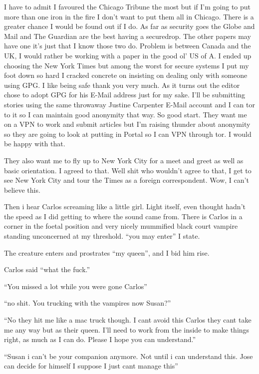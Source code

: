I have to admit I favoured the Chicago Tribune the most but if I'm going to put more than one iron in the fire I don't want to put them all in Chicago. There is a greater chance I would be found out if I do. As far as security goes the Globe and Mail and The Guardian are the best having a securedrop. The other papers may have one it's just that I know those two do. Problem is between Canada and the UK, I would rather be working with a paper in the good ol' US of A. I ended up choosing the New York Times but among the worst for secure systems I put my foot down so hard I cracked concrete on insisting on dealing only with someone using GPG. I like being safe thank you very much. As it turns out the editor chose to adopt GPG for his E-Mail address just for my sake. I'll be submitting stories using the same throwaway Justine Carpenter E-Mail account and I can tor to it so I can maintain good anonymity that way. So good start. They want me on a VPN to work and submit articles but I'm raising thunder about anonymity so they are going to look at putting in Portal so I can VPN through tor. I would be happy with that.

They also want me to fly up to New York City for a meet and greet as well as basic orientation. I agreed to that. Well shit who wouldn't agree to that, I get to see New York City  and tour the Times as a foreign correspondent. Wow, I can't believe this.

Then i hear Carlos screaming like a little girl. Light itself, even thought hadn't the speed as I did getting to where the sound came from. There is Carlos in a corner in the foetal position and very nicely mummified black court vampire standing unconcerned at my threshold. ``you may enter'' I state.

The creature enters and prostrates ``my queen'', and I bid him rise. 

Carlos said ``what the fuck.''

``You missed a lot while you were gone Carlos''

``no shit. You trucking with the vampires now Susan?''

``No they hit me like a mac truck though. I cant avoid this Carlos they cant take me any way but as their queen. I'll need to work from the inside to make things right, as much as I can do. Please I hope you can understand.''

``Susan i can't be your companion anymore. Not until i can understand this. Jose can decide for himself I suppose I just cant manage this''

